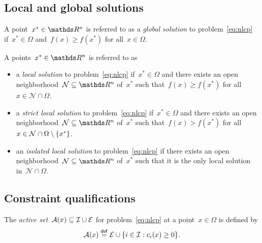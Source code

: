 \subsection{Local and global solutions}

\begin{definition}
    A point~$x^{\ast} \in \R^n$ is referred to as a \emph{global solution} to problem~\cref{eq:nlcp} if~$x^{\ast} \in \Omega$ and~$f(x) \ge f(x^{\ast})$ for all~$x \in \Omega$.
\end{definition}

\begin{definition}
    A points~$x^{\ast} \in \R^n$ is referred to as
    \begin{itemize}
        \item a \emph{local solution} to problem~\cref{eq:nlcp} if~$x^{\ast} \in \Omega$ and there exists an open neighborhood~$\mathcal{N} \subseteq \R^n$ of~$x^{\ast}$ such that~$f(x) \ge f(x^{\ast})$ for all~$x \in \mathcal{N} \cap \Omega$.
        \item a \emph{strict local solution} to problem~\cref{eq:nlcp} if~$x^{\ast} \in \Omega$ and there exists an open neighborhood~$\mathcal{N} \subseteq \R^n$ of~$x^{\ast}$ such that~$f(x) > f(x^{\ast})$ for all~$x \in \mathcal{N} \cap \Omega \setminus \{x^{\ast}\}$.
        \item an \emph{isolated local solution} to problem~\cref{eq:nlcp} if there exists an open neighborhood~$\mathcal{N} \subseteq \R^n$ of~$x^{\ast}$ such that it is the only local solution in~$\mathcal{N} \cap \Omega$.
    \end{itemize}
\end{definition}

\subsection{Constraint qualifications}

\begin{definition}
    The \emph{active set}~$\mathcal{A}(x) \subseteq \mathcal{I} \cup \mathcal{E}$ for problem~\cref{eq:nlcp} at a point~$x \in \Omega$ is defined by
    \begin{equation*}
        \mathcal{A}(x) \mathrel{\stackrel{\mathsf{def}}{=}} \mathcal{E} \cup \{i \in \mathcal{I} : c_{i}(x) \ge 0\}.
    \end{equation*}
\end{definition}

